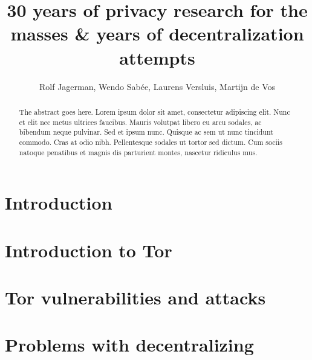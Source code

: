 \documentclass[journal]{IEEEtran}
\begin{document}


\title{30 years of privacy research for the masses \&  years of decentralization attempts}
\author{Rolf Jagerman, Wendo Sab\'ee, Laurens Versluis, Martijn de Vos}


\maketitle

\begin{abstract}
	The abstract goes here. Lorem ipsum dolor sit amet, consectetur adipiscing elit. Nunc et elit nec metus ultrices faucibus. Mauris volutpat libero eu arcu sodales, ac bibendum neque pulvinar. Sed et ipsum nunc. Quisque ac sem ut nunc tincidunt commodo. Cras at odio nibh. Pellentesque sodales ut tortor sed dictum. Cum sociis natoque penatibus et magnis dis parturient montes, nascetur ridiculus mus. 
\end{abstract}


\section{Introduction}
	\label{sec:introduction}
	
	
\section{Introduction to Tor}
	\label{sec:tor}
	
		
\section{Tor vulnerabilities and attacks}
	\label{sec:attacks}
	

\section{Problems with decentralizing}
	\label{sec:problems}
	
\end{document}
